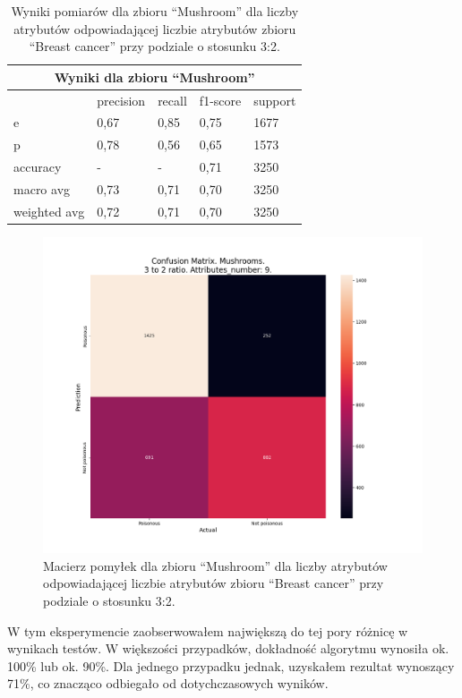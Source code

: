 \begin{table}[h!]
        \centering
        \begin{tabular}{ |p{2cm}|p{2cm}|p{2cm}|p{2cm}|p{2cm}| }
                \hline
                \multicolumn{5}{|c|}{Wyniki dla zbioru ``Mushroom''} \\
                \hline
                 & precision & recall & f1-score & support \\
                \hline
                e & 0,67 & 0,85 & 0,75 & 1677 \\
                \hline
                p & 0,78 & 0,56 & 0,65 & 1573 \\
                \hline
                accuracy & - & - & 0,71 & 3250 \\
                \hline
                macro avg & 0,73 & 0,71 & 0,70 & 3250 \\
                \hline
                weighted avg & 0,72 & 0,71 & 0,70 & 3250 \\
                \hline
        \end{tabular}
        \caption{Wyniki pomiarów dla zbioru ``Mushroom'' dla liczby atrybutów odpowiadającej liczbie atrybutów zbioru ``Breast cancer'' przy podziale o stosunku 3:2.}
\end{table}

\begin{figure}[h!]
	\centering
		\includegraphics[width=0.7\linewidth]{photos/mush_n_attr_3_to_2_r.png}
        \caption{Macierz pomyłek dla zbioru ``Mushroom'' dla liczby atrybutów odpowiadającej liczbie atrybutów zbioru ``Breast cancer'' przy podziale o stosunku 3:2.}
\end{figure}
\clearpage

W tym eksperymencie zaobserwowałem największą do tej pory różnicę w wynikach
testów. W większości przypadków, dokładność algorytmu wynosiła ok. 100\% lub
ok. 90\%. Dla jednego przypadku jednak, uzyskałem rezultat wynoszący 71\%, co
znacząco odbiegało od dotychczasowych wyników.


